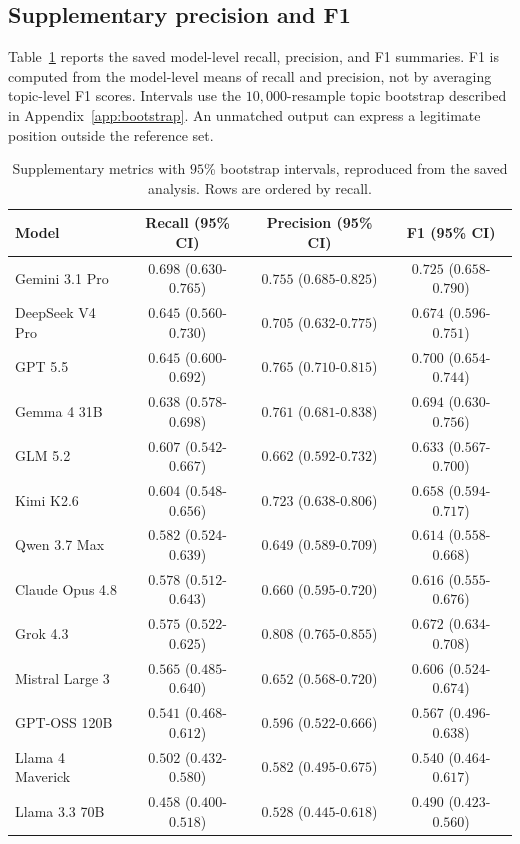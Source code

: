 \documentclass[11pt,a4paper]{article}
\begin{document}
\subsection{Supplementary precision and F1}
\label{app:prf-results}
Table~\ref{tab:prf-supplement} reports the saved model-level recall, precision, and F1 summaries. F1 is computed from the model-level means of recall and precision, not by averaging topic-level F1 scores. Intervals use the $10{,}000$-resample topic bootstrap described in Appendix~\ref{app:bootstrap}. An unmatched output can express a legitimate position outside the reference set.
\begin{table}[t]
\centering\small
\caption{Supplementary metrics with $95$\% bootstrap intervals, reproduced from the saved analysis. Rows are ordered by recall.}
\label{tab:prf-supplement}
\begin{tabular}{@{}lccc@{}}
\toprule
Model & Recall (95\% CI) & Precision (95\% CI) & F1 (95\% CI)\\
\midrule
Gemini 3.1 Pro & $0.698$ ($0.630$-$0.765$) & $0.755$ ($0.685$-$0.825$) & $0.725$ ($0.658$-$0.790$)\\
DeepSeek V4 Pro & $0.645$ ($0.560$-$0.730$) & $0.705$ ($0.632$-$0.775$) & $0.674$ ($0.596$-$0.751$)\\
GPT 5.5 & $0.645$ ($0.600$-$0.692$) & $0.765$ ($0.710$-$0.815$) & $0.700$ ($0.654$-$0.744$)\\
Gemma 4 31B & $0.638$ ($0.578$-$0.698$) & $0.761$ ($0.681$-$0.838$) & $0.694$ ($0.630$-$0.756$)\\
GLM 5.2 & $0.607$ ($0.542$-$0.667$) & $0.662$ ($0.592$-$0.732$) & $0.633$ ($0.567$-$0.700$)\\
Kimi K2.6 & $0.604$ ($0.548$-$0.656$) & $0.723$ ($0.638$-$0.806$) & $0.658$ ($0.594$-$0.717$)\\
Qwen 3.7 Max & $0.582$ ($0.524$-$0.639$) & $0.649$ ($0.589$-$0.709$) & $0.614$ ($0.558$-$0.668$)\\
Claude Opus 4.8 & $0.578$ ($0.512$-$0.643$) & $0.660$ ($0.595$-$0.720$) & $0.616$ ($0.555$-$0.676$)\\
Grok 4.3 & $0.575$ ($0.522$-$0.625$) & $0.808$ ($0.765$-$0.855$) & $0.672$ ($0.634$-$0.708$)\\
Mistral Large 3 & $0.565$ ($0.485$-$0.640$) & $0.652$ ($0.568$-$0.720$) & $0.606$ ($0.524$-$0.674$)\\
GPT-OSS 120B & $0.541$ ($0.468$-$0.612$) & $0.596$ ($0.522$-$0.666$) & $0.567$ ($0.496$-$0.638$)\\
Llama 4 Maverick & $0.502$ ($0.432$-$0.580$) & $0.582$ ($0.495$-$0.675$) & $0.540$ ($0.464$-$0.617$)\\
Llama 3.3 70B & $0.458$ ($0.400$-$0.518$) & $0.528$ ($0.445$-$0.618$) & $0.490$ ($0.423$-$0.560$)\\
\bottomrule
\end{tabular}
\end{table}
\end{document}
